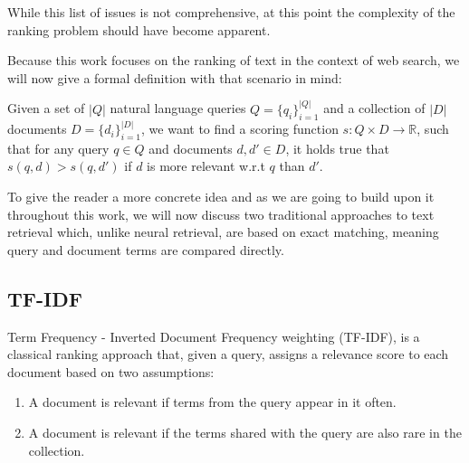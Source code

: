 While this list of issues is not comprehensive, at this point the complexity of the ranking problem should have become apparent.

Because this work focuses on the ranking of text in the context of web search, we will now give a formal definition with that scenario in mind:

Given a set of $|Q|$ natural language queries $Q = \{q_i\}_{i=1}^{|Q|}$ and a collection of $|D|$ documents $D = \{d_i\}_{i=1}^{|D|}$, we want to find a scoring function $s: Q \times D \rightarrow \mathbb{R}$, such that for any query $q \in Q$ and documents $d, d' \in D$, it holds true that $s(q, d) > s(q, d')$ if $d$ is more relevant w.r.t $q$ than $d'$.

To give the reader a more concrete idea and as we are going to build upon it throughout this work, we will now discuss two traditional approaches to text retrieval which, unlike neural retrieval, are based on exact matching, meaning query and document terms are compared directly.

\subsection{TF-IDF}
Term Frequency - Inverted Document Frequency weighting (TF-IDF), is a classical ranking approach that, given a query, assigns a relevance score to each document based on two assumptions:
\begin{enumerate}
    \item A document is relevant if terms from the query appear in it often.
    \item A document is relevant if the terms shared with the query are also rare in the collection.
\end{enumerate}

